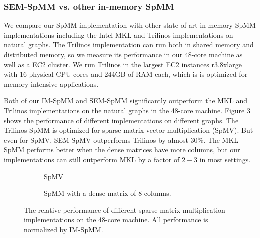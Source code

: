 \subsubsection{SEM-SpMM vs. other in-memory SpMM}

We compare our SpMM implementation with other state-of-art in-memory SpMM
implementations including the Intel MKL and Trilinos implementations on
natural graphs. The Trilinos implementation can run both in shared memory
and distributed memory, so we measure its performance in our 48-core machine
as well as a EC2 cluster. We run Trilinos in the largest EC2 instances r3.8xlarge
with 16 physical CPU cores and 244GB of RAM each, which is is optimized for
memory-intensive applications.

Both of our IM-SpMM and SEM-SpMM significantly outperform the MKL and Trilinos
implementations on the natural graphs in the 48-core machine. Figure \ref{perf:spmm}
shows the performance of different implementations on different graphs.
The Trilinos SpMM is optimized for sparse matrix vector
multiplication (SpMV). But even for SpMV, SEM-SpMV outperforms Trilinos by
almost 30\%. The MKL SpMM performs better when the dense matrices have more columns,
but our implementations can still outperform MKL by a factor of $2-3$ in most
settings.

\begin{figure}[t!]
	\footnotesize
	\centering
	\begin{subfigure}[b]{0.5\textwidth}
		\centering
		
		\vspace{-10pt}
		\caption{SpMV}
		\label{perf:spmv}
	\end{subfigure}
	\begin{subfigure}[b]{0.5\textwidth}
		\centering
		
		\vspace{-10pt}
		\caption{SpMM with a dense matrix of 8 columns.}
		\label{perf:spmm8}
	\end{subfigure}
	\vspace{3pt}
	\caption{The relative performance of different sparse matrix multiplication
		implementations on the 48-core machine. All performance is normalized by
	IM-SpMM.}
	\label{perf:spmm}
\end{figure}

\begin{figure}
	\begin{center}
		\footnotesize
		
		\caption{}
		\label{perf:ec2}
	\end{center}
\end{figure}


